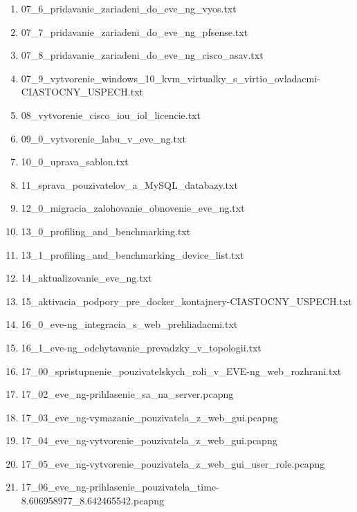 \begin{enumerate}[noitemsep,label*=\thesection.\arabic*.]
\begin{enumerate}[noitemsep,label*=\arabic*.]
        \item 07\_6\_pridavanie\_zariadeni\_do\_eve\_ng\_vyos.txt
        \item 07\_7\_pridavanie\_zariadeni\_do\_eve\_ng\_pfsense.txt
        \item \label{item:pridavanie_cisco_asav} 07\_8\_pridavanie\_zariadeni\_do\_eve\_ng\_cisco\_asav.txt
        \item \label{item:pridavanie_win} 07\_9\_vytvorenie\_windows\_10\_kvm\_virtualky\_s\_virtio\_ovladacmi-CIASTOCNY\_USPECH.txt
        \item \label{item:iou_licencia} 08\_vytvorenie\_cisco\_iou\_iol\_licencie.txt
        \item 09\_0\_vytvorenie\_labu\_v\_eve\_ng.txt
        \item \label{item:uprava_sablon} 10\_0\_uprava\_sablon.txt
        \item \label{item:sprava_pouzivatelov_a_databazy} 11\_sprava\_pouzivatelov\_a\_MySQL\_databazy.txt
        \item \label{item:obnova_zalohovanie} 12\_0\_migracia\_zalohovanie\_obnovenie\_eve\_ng.txt
        \item \label{item:benchmarking_popis} 13\_0\_profiling\_and\_benchmarking.txt
        \item \label{item:benchmarking_list} 13\_1\_profiling\_and\_benchmarking\_device\_list.txt
        \item \label{item:aktualizacia_eve_ng} 14\_aktualizovanie\_eve\_ng.txt
        \item 15\_aktivacia\_podpory\_pre\_docker\_kontajnery-CIASTOCNY\_USPECH.txt
        \item 16\_0\_eve-ng\_integracia\_s\_web\_prehliadacmi.txt
        \item 16\_1\_eve-ng\_odchytavanie\_prevadzky\_v\_topologii.txt
        \item \label{item:spristupnenie_pouzivatelskych_roli} 17\_00\_spristupnenie\_pouzivatelskych\_roli\_v\_EVE-ng\_web\_rozhrani.txt
        \item 17\_02\_eve\_ng-prihlasenie\_sa\_na\_server.pcapng
        \item 17\_03\_eve\_ng-vymazanie\_pouzivatela\_z\_web\_gui.pcapng
        \item 17\_04\_eve\_ng-vytvorenie\_pouzivatela\_z\_web\_gui.pcapng
        \item 17\_05\_eve\_ng-vytvorenie\_pouzivatela\_z\_web\_gui\_user\_role.pcapng
        \item 17\_06\_eve\_ng-prihlasenie\_pouzivatela\_time-8.606958977\_8.642465542.pcapng

\end{enumerate}
\end{enumerate}
